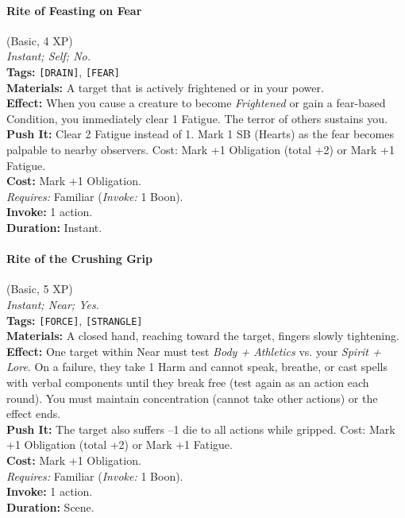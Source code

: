 \paragraph{Rite of Feasting on Fear} (Basic, 4 XP) \hfill \\
\emph{Instant; Self; No.} \\
\textbf{Tags:} \texttt{[DRAIN]}, \texttt{[FEAR]} \\
\textbf{Materials:} A target that is actively frightened or in your power. \\
\textbf{Effect:} When you cause a creature to become \textit{Frightened} or gain a fear-based Condition, you immediately clear 1 Fatigue. The terror of others sustains you. \\
\textbf{Push It:} Clear 2 Fatigue instead of 1. Mark 1 SB (Hearts) as the fear becomes palpable to nearby observers. Cost: Mark +1 Obligation (total +2) or Mark +1 Fatigue. \\
\textbf{Cost:} Mark +1 Obligation. \\
\textit{Requires:} Familiar (\textit{Invoke:} 1 Boon). \\
\textbf{Invoke:} 1 action. \\
\textbf{Duration:} Instant.

\paragraph{Rite of the Crushing Grip} (Basic, 5 XP) \hfill \\
\emph{Instant; Near; Yes.} \\
\textbf{Tags:} \texttt{[FORCE]}, \texttt{[STRANGLE]} \\
\textbf{Materials:} A closed hand, reaching toward the target, fingers slowly tightening. \\
\textbf{Effect:} One target within Near must test \textit{Body + Athletics} vs. your \textit{Spirit + Lore}. On a failure, they take 1 Harm and cannot speak, breathe, or cast spells with verbal components until they break free (test again as an action each round). You must maintain concentration (cannot take other actions) or the effect ends. \\
\textbf{Push It:} The target also suffers --1 die to all actions while gripped. Cost: Mark +1 Obligation (total +2) or Mark +1 Fatigue. \\
\textbf{Cost:} Mark +1 Obligation. \\
\textit{Requires:} Familiar (\textit{Invoke:} 1 Boon). \\
\textbf{Invoke:} 1 action. \\
\textbf{Duration:} Scene.

